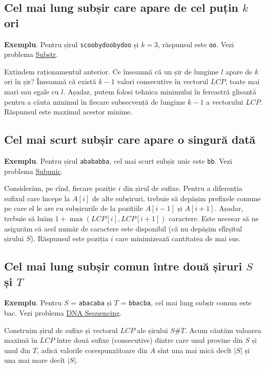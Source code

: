 \documentclass[../main.tex]{subfiles}
\begin{document}
\subsection{Cel mai lung subșir care apare de cel puțin \texorpdfstring{$k$}{k} ori}

\textbf{Exemplu}. Pentru șirul \texttt{scoobydoobydoo} și $k = 3$, răspunsul este \texttt{oo}. Vezi problema \href{https://infoarena.ro/problema/substr}{Substr}.

Extindem raționamentul anterior. Ce înseamnă că un șir de lungime $l$ apare de $k$ ori în șir? Înseamnă că există $k - 1$ valori consecutive în vectorul $LCP$, toate mai mari sau egale cu $l$. Așadar, putem folosi tehnica minimului în fereastră glisantă pentru a căuta minimul în fiecare subsecvență de lungime $k-1$ a vectorului $LCP$. Răspunsul este maximul acestor minime.

\subsection{Cel mai scurt subșir care apare o singură dată}

\textbf{Exemplu}. Pentru șirul \texttt{abababba}, cel mai scurt subșir unic este \texttt{bb}. Vezi problema \href{https://www.nerdarena.ro/problema/subunic}{Subunic}.

Considerăm, pe rînd, fiecare poziție $i$ din șirul de sufixe. Pentru a diferenția sufixul care începe la $A[i]$ de alte subșiruri, trebuie să depășim prefixele comune pe care el le are cu subșirurile de la pozițiile $A[i - 1]$ și $A[i + 1]$. Așadar, trebuie să luăm $1 + \max(LCP[i], LCP[i + 1])$ caractere. Este necesar să ne asigurăm că acel număr de caractere este disponibil (că nu depășim sfîrșitul șirului $S$). Răspunsul este poziția $i$ care minimizează cantitatea de mai sus.

\subsection{Cel mai lung subșir comun între două șiruri \texorpdfstring{$S$}{S} și \texorpdfstring{$T$}{T}}

\textbf{Exemplu}. Pentru $S$ = \texttt{abacaba} și $T$ = \texttt{bbacba}, cel mai lung subșir comun este bac. Vezi problema \href{https://onlinejudge.org/index.php?option=onlinejudge\&page=show_problem\&problem=701}{DNA Sequencing}.

Construim șirul de sufixe și vectorul $LCP$ ale șirului $S\#T$. Acum căutăm valoarea maximă în $LCP$ între două sufixe (consecutive) dintre care unul provine din $S$ și unul din $T$, adică valorile corespunzătoare din $A$ sînt una mai mică decît $|S|$ și una mai mare decît $|S|$.
\end{document}
